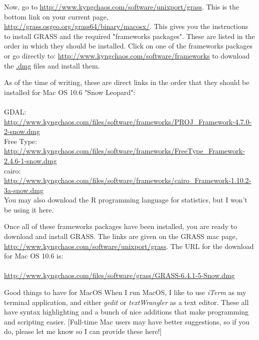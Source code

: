 \documentclass{book}
\begin{document}
Now, go to \url{http://www.kyngchaos.com/software/unixport/grass}. This is the bottom link on your current page, \url{http://grass.osgeo.org/grass64/binary/macosx/}. This gives you the instructions to install GRASS and the required "frameworks packages". These are listed in the order in which they should be installed. Click on one of the frameworks packages or go directly to: \url{http://www.kyngchaos.com/software/frameworks} to download the \url{.dmg} files and install them.

As of the time of writing, these are direct links in the order that they should be installed for Mac OS 10.6 "Snow Leopard":
\\ \\
GDAL: \\
\url{http://www.kyngchaos.com/files/software/frameworks/PROJ_Framework-4.7.0-2-snow.dmg} \\
Free Type: \\
\url{http://www.kyngchaos.com/files/software/frameworks/FreeType_Framework-2.4.6-1-snow.dmg} \\
cairo: \\
\url{http://www.kyngchaos.com/files/software/frameworks/cairo_Framework-1.10.2-3a-snow.dmg} \\

You may also download the R programming language for statistics, but I won't be using it here.

Once all of these frameworks packages have been installed, you are ready to download and install GRASS. The links are given on the GRASS mac page, \url{http://www.kyngchaos.com/software/unixport/grass}. The URL for the download for Mac OS 10.6 is:  \\
\\
\url{http://www.kyngchaos.com/files/software/grass/GRASS-6.4.1-5-Snow.dmg}

\begin{boxx}[!ht]
\begin{bclogo}[arrondi = 0.1, logo = \bcrosevents]{Good things to have for MacOS}
When I run MacOS, I like to use \emph{iTerm} as my terminal application, and either \emph{gedit} or \emph{textWrangler} as a text editor. These all have syntax highlighting and a bunch of nice additions that make programming and scripting easier. [Full-time Mac users may have better suggestions, so if you do, please let me know so I can provide these here!]
\end{bclogo}
\caption{Good things to have for MacOS}
\end{boxx}
\end{document}
